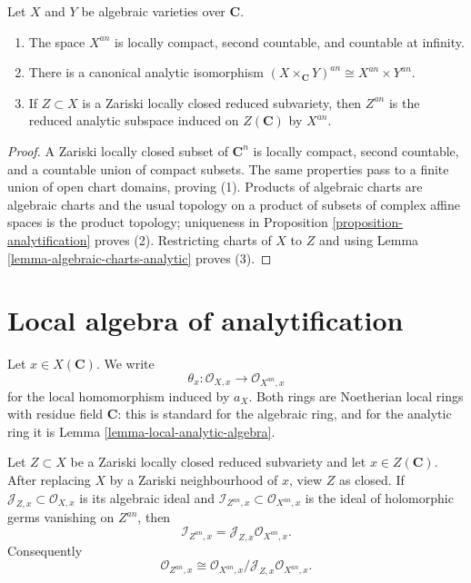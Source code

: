 \begin{lemma}
\label{lemma-analytification-properties}
Let $X$ and $Y$ be algebraic varieties over $\mathbf C$.
\begin{enumerate}
\item The space $X^{an}$ is locally compact, second countable, and countable
at infinity.
\item There is a canonical analytic isomorphism
$(X \times_{\mathbf C} Y)^{an} \cong X^{an} \times Y^{an}$.
\item If $Z \subset X$ is a Zariski locally closed reduced subvariety, then
$Z^{an}$ is the reduced analytic subspace induced on $Z(\mathbf C)$ by
$X^{an}$.
\end{enumerate}
\end{lemma}

\begin{proof}
A Zariski locally closed subset of $\mathbf C^n$ is locally compact, second
countable, and a countable union of compact subsets. The same properties pass
to a finite union of open chart domains, proving (1). Products of algebraic
charts are algebraic charts and the usual topology on a product of subsets of
complex affine spaces is the product topology; uniqueness in
Proposition \ref{proposition-analytification} proves (2). Restricting charts of
$X$ to $Z$ and using Lemma \ref{lemma-algebraic-charts-analytic} proves (3).
\end{proof}

\section{Local algebra of analytification}
\label{section-local-comparison}

\noindent
Let $x \in X(\mathbf C)$. We write
$$
\theta_x : \mathcal O_{X,x} \longrightarrow \mathcal O_{X^{an},x}
$$
for the local homomorphism induced by $a_X$. Both rings are Noetherian local
rings with residue field $\mathbf C$: this is standard for the algebraic ring,
and for the analytic ring it is Lemma \ref{lemma-local-analytic-algebra}.

\begin{proposition}
\label{proposition-analytification-closed-ideal}
Let $Z \subset X$ be a Zariski locally closed reduced subvariety and let
$x \in Z(\mathbf C)$. After replacing $X$ by a Zariski neighbourhood of $x$,
view $Z$ as closed. If $\mathcal J_{Z,x} \subset \mathcal O_{X,x}$ is its
algebraic ideal and $\mathcal I_{Z^{an},x} \subset
\mathcal O_{X^{an},x}$ is the ideal of holomorphic germs vanishing on
$Z^{an}$, then
$$
\mathcal I_{Z^{an},x} =
\mathcal J_{Z,x}\mathcal O_{X^{an},x}.
$$
Consequently
$$
\mathcal O_{Z^{an},x} \cong
\mathcal O_{X^{an},x}/
\mathcal J_{Z,x}\mathcal O_{X^{an},x}.
$$
\end{proposition}

